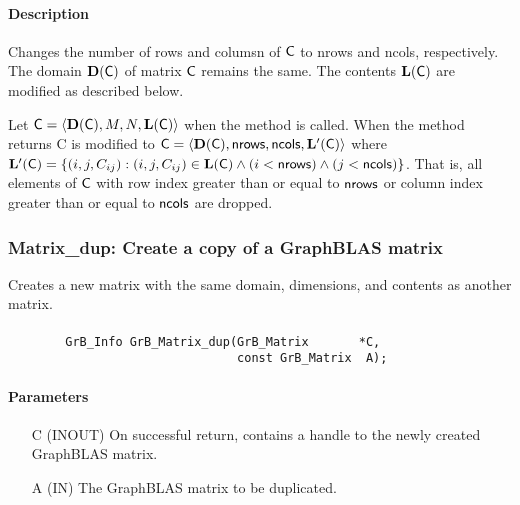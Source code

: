 \paragraph{Description}

Changes the number of rows and columsn of ${\sf C}$ to {\sf nrows} and {\sf ncols}, respectively. The domain
$\mathbf{D}({\sf C})$ of matrix ${\sf C}$ remains the same. The
contents $\mathbf{L}({\sf C})$ are modified as described below.

Let ${\sf C} = \langle \mathbf{D}({\sf C}), M, N, \mathbf{L}({\sf C})
\rangle$ when the method is called. When the method returns {\sf C} is modified to ${\sf C}
= \langle \mathbf{D}({\sf C}), {\sf nrows}, {\sf ncols}, \mathbf{L'}({\sf C})
\rangle$ where $\mathbf{L'}({\sf C}) = \{(i,j,C_{ij}) : (i,j,C_{ij}) \in
\mathbf{L}({\sf C}) \wedge (i < {\sf nrows}) \wedge (j < {\sf ncols})\}$. That is, all elements
of ${\sf C}$ with row index greater than or equal to 
${\sf nrows}$ or column index greater than or equal to ${\sf ncols}$ are dropped.

\subsubsection{{\sf Matrix\_dup}: Create a copy of a GraphBLAS matrix}

Creates a new matrix with the same domain, dimensions, and contents as 
another matrix.

\paragraph{\syntax}

\begin{verbatim}
        GrB_Info GrB_Matrix_dup(GrB_Matrix       *C,
                                const GrB_Matrix  A);
\end{verbatim}

\paragraph{Parameters}

\begin{itemize}[leftmargin=1.1in]
    \item[{\sf C}] ({\sf INOUT}) On successful return, contains a handle to 
                                 the newly created GraphBLAS matrix.
    \item[{\sf A}] ({\sf IN})    The GraphBLAS matrix to be duplicated.
\end{itemize}


